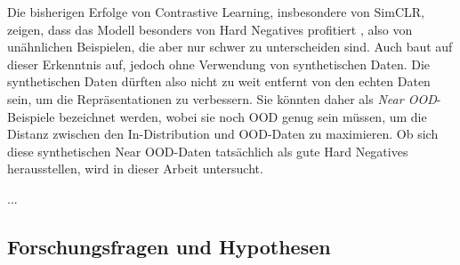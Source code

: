Die bisherigen Erfolge von Contrastive Learning, insbesondere von SimCLR, zeigen, dass das Modell besonders von Hard Negatives profitiert \parencite{Chen2020simclr}, also von unähnlichen Beispielen, die aber nur schwer zu unterscheiden sind. Auch \parencite{Jiang2024supconhardnegatives} baut auf dieser Erkenntnis auf, jedoch ohne Verwendung von synthetischen Daten. Die synthetischen Daten dürften also nicht zu weit entfernt von den echten Daten sein, um die Repräsentationen zu verbessern. Sie könnten daher als \textit{Near OOD}-Beispiele bezeichnet werden, wobei sie noch OOD genug sein müssen, um die Distanz zwischen den In-Distribution und OOD-Daten zu maximieren. Ob sich diese synthetischen Near OOD-Daten tatsächlich als gute Hard Negatives herausstellen, wird in dieser Arbeit untersucht.



...






\subsection{Forschungsfragen und Hypothesen} \label{sec:research-questions}

